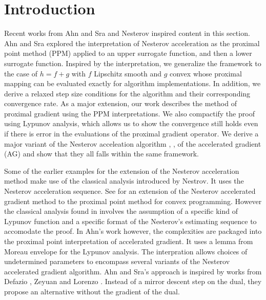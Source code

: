 \documentclass[12pt]{article}
\begin{document}
\section{Introduction}
    Recent works from Ahn and Sra \cite{ahn_understanding_2022} and Nesterov \cite{nesterov_lectures_2018} inspired content in this section.
    Ahn and Sra explored the interpretation of Nesterov acceleration as the proximal point method (PPM) applied to an upper surrogate function, and then a lower surrogate function. 
    Inspired by the interpretation, we generalize the framework to the case of $h = f + g$ with $f$ Lipschitz smooth and $g$ convex whose proximal mapping can be evaluated exactly for algorithm implementations. 
    In addition, we derive a relaxed step size conditions for the algorithm and their corresponding convergence rate. 
    As a major extension, our work describes the method of proximal gradient using the PPM interpretations. 
    We also compactify the proof using Lypunov analysis, which allows us to show the convergence still holds even if there is error in the evaluations of the proximal gradient operator. 
    We derive a major variant of the Nesterov acceleation algorithm
    \cite{chambolle_convergence_2015}, \cite{beck_fast_2009-1}, \cite[Chapter 12]{ryu_large-scale_2022}
    of the accelerated gradient (AG) and show that they all falls within the same framework. 

    \par
    Some of the earlier examples for the extension of the Nesterov acceleration method make use of the classical analysis introduced by Nestrov. 
    It uses the Nesterov acceleration sequence. 
    See \cite{guler_new_1992} for an extension of the Nesterov accelerated gradient method to the proximal point method for convex programming. 
    However the classical analysis found in \cite[chapter 2]{nesterov_lectures_2018} involves the assumption of a specific kind of Lypunov function and a specific format of the Nesterov's estimating sequence to accomodate the proof. 
    In Ahn's work however, the complexities are packaged into the proximal point interpretation of accelerated gradient. 
    It uses a lemma from Moreau envelope for the Lypunov analysis.
    The interpration allows choices of undetermined parameters to encompass several variants of the Nesterov accelerated gradient algorithm. 
    Ahn and Sra's approach is inspired by works from Defazio \cite{defazio_curved_2019}, Zeyuan and Lorenzo \cite{allen-zhu_linear_2016}. 
    Instead of a mirror descent step on the dual, they propose an alternative without the gradient of the dual. 
    
\end{document}
